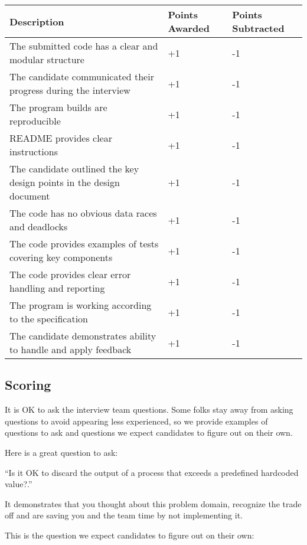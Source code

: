 \documentclass{article}
\begin{document}
\begin{center}
\begin{tabular}{ | m{25em} | m{5em}| m{5em} | }
  \hline
  \rowcolor{blue!60!black!10}
  Description & Points Awarded & Points Subtracted \\
  \hline
  The submitted code has a clear and modular structure & +1 & -1 \\
  \hline   
  The candidate communicated their progress during the interview & +1 & -1 \\
  \hline
  The program builds are reproducible & +1 & -1 \\
  \hline
  README provides clear instructions & +1 & -1 \\
  \hline
  The candidate outlined the key design points in the design document & +1 & -1 \\
  \hline
  The code has no obvious data races and deadlocks & +1 & -1 \\
  \hline
  The code provides examples of tests covering key components & +1 & -1 \\
  \hline
  The code provides clear error handling and reporting & +1 & -1 \\
  \hline
  The program is working according to the specification & +1 & -1 \\
  \hline
  The candidate demonstrates ability to handle and apply feedback & +1 & -1 \\
  \hline
\end{tabular}
\end{center}

\subsection{Scoring}

It is OK to ask the interview team questions. Some folks stay away from
asking questions to avoid appearing less experienced, so we provide examples of questions
to ask and questions we expect candidates to figure out on their own.

Here is a great question to ask:

``Is it OK to discard the output of a process that exceeds a predefined hardcoded value?.''

It demonstrates that you thought about this problem domain, recognize the trade off and are saving you and the team time by not implementing it.

This is the question we expect candidates to figure out on their own:
\end{document}
